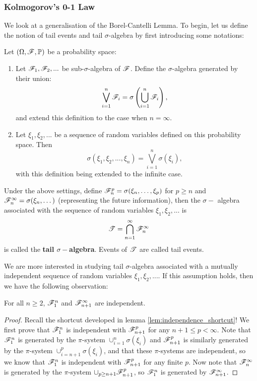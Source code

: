 \subsubsection{Kolmogorov's 0-1 Law}
We look at a generalisation of the Borel-Cantelli Lemma. To begin, let us define the notion of tail events and tail $\sigma$-algebra by first introducing some notations:
\begin{definition}
Let $(\Omega, \mathcal{F}, \mathbb{P})$ be a probability space: 
\begin{enumerate}
    \item Let $\mathcal{F}_1, \mathcal{F}_2, ...$ be sub-$\sigma$-algebra of $\mathcal{F}$. Define the $\sigma$-algebra generated by their union:
    \begin{equation}
        \bigvee_{i=1}^n \mathcal{F}_i = \sigma\left( \bigcup_{i=1}^n \mathcal{F}_i \right),
    \end{equation}
    and extend this definition to the case when $n=\infty$.
    \item Let $\xi_1, \xi_2,...$ be a sequence of random variables defined on this probability space. Then
    \begin{equation}
        \sigma(\xi_1,\xi_2,...,\xi_n) = \bigvee_{i=1}^n \sigma(\xi_i),
    \end{equation}
    with this definition being extended to the infinite case.
\end{enumerate}
\end{definition}

\begin{definition}
Under the above settings, define $\mathcal{F}_n^p = \sigma (\xi_n, \dots, \xi_p)$ for $p\geq n$ and $\mathcal{F}_n^\infty = \sigma (\xi_n, \dots)$ (representing the future information), then the $\sigma-$ algebra associated with the sequence of random variables $\xi_1, \xi_2, ...$ is
\begin{equation*}
    \mathcal{T} = \bigcap_{n=1}^\infty \mathcal{F}_n^\infty
\end{equation*}
is called the \textbf{tail $\sigma-$algebra}. Events of $\mathcal{T}$ are called tail events.
\end{definition}

We are more interested in studying tail $\sigma$-algebra associated with a mutually independent sequence of random variables $\xi_1, \xi_2, ...$. If this assumption holds, then we have the following observation:
\begin{lemma}
For all $n \geq 2$, $\mathcal{F}_1^n$ and $\mathcal{F}_{n+1}^\infty$ are independent.
\end{lemma}

\begin{proof}
Recall the shortcut developed in lemma \ref{lem:independence_shortcut}! We first prove that $\mathcal{F}_1^n$ is independent with $\mathcal{F}_{n+1}^p$ for any $n+1 \leq p < \infty$. Note that $\mathcal{F}_1^n$ is generated by the $\pi$-system $\cup_{i=1}^n \sigma(\xi_i)$ and $\mathcal{F}_{n+1}^p$ is similarly generated by the $\pi$-system $\cup_{i=n+1}^p \sigma(\xi_i)$, and that these $\pi$-systems are independent, so we know that $\mathcal{F}_1^n$ is independent with $\mathcal{F}_{n+1}^p$ for any finite $p$. Now note that $\mathcal{F}_n^\infty$ is generated by the $\pi$-system $\cup_{p\geq n+1} \mathcal{F}_{n+1}^p$, so $\mathcal{F}_1^n$ is generated by $\mathcal{F}_{n+1}^\infty$.
\end{proof}

